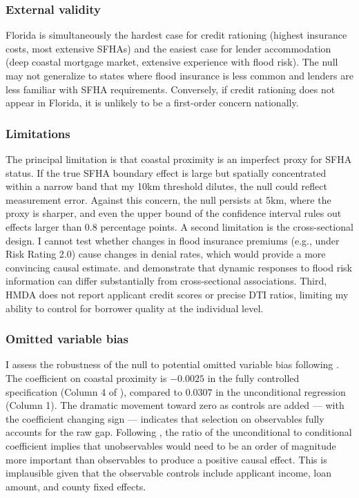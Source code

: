 \documentclass[12pt]{article}
\begin{document}
\subsubsection*{External validity} Florida is simultaneously the hardest case for credit rationing (highest insurance costs, most extensive SFHAs) and the easiest case for lender accommodation (deep coastal mortgage market, extensive experience with flood risk). The null may not generalize to states where flood insurance is less common and lenders are less familiar with SFHA requirements. Conversely, if credit rationing does not appear in Florida, it is unlikely to be a first-order concern nationally.

\subsubsection*{Limitations} The principal limitation is that coastal proximity is an imperfect proxy for SFHA status. If the true SFHA boundary effect is large but spatially concentrated within a narrow band that my 10km threshold dilutes, the null could reflect measurement error. Against this concern, the null persists at 5km, where the proxy is sharper, and even the upper bound of the confidence interval rules out effects larger than 0.8 percentage points. A second limitation is the cross-sectional design. I cannot test whether changes in flood insurance premiums (e.g., under Risk Rating 2.0) cause changes in denial rates, which would provide a more convincing causal estimate. \citet{wagner2022adaptation} and \citet{gibson2020climate} demonstrate that dynamic responses to flood risk information can differ substantially from cross-sectional associations. Third, HMDA does not report applicant credit scores or precise DTI ratios, limiting my ability to control for borrower quality at the individual level.

\subsubsection*{Omitted variable bias} I assess the robustness of the null to potential omitted variable bias following \citet{oster2019unobservable}. The coefficient on coastal proximity is $-0.0025$ in the fully controlled specification (Column 4 of ), compared to $0.0307$ in the unconditional regression (Column 1). The dramatic movement toward zero as controls are added --- with the coefficient changing sign --- indicates that selection on observables fully accounts for the raw gap. Following \citet{altonji2005selection}, the ratio of the unconditional to conditional coefficient implies that unobservables would need to be an order of magnitude more important than observables to produce a positive causal effect. This is implausible given that the observable controls include applicant income, loan amount, and county fixed effects.
\end{document}
